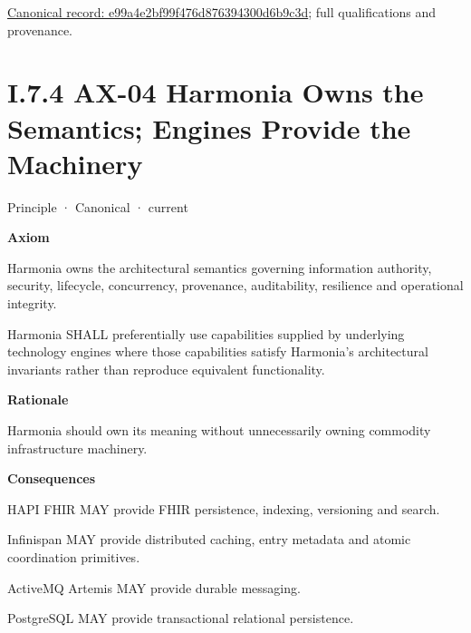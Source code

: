{\footnotesize \href{../../../../../../../../continuum/motivation/principle/e99a4e2bf99f476d876394300d6b9c3d.md}{Canonical record: e99a4e2bf99f476d876394300d6b9c3d}; full qualifications and provenance.}\par
\section*{I.7.4 AX-04 Harmonia Owns the Semantics; Engines Provide the Machinery}
\label{navigation:I.7.4}

\label{element:54508cda80484a6caf95b901780eaf7d}
{\small Principle · Canonical · current}\par

\par\medskip\textbf{Axiom}\par


Harmonia owns the architectural semantics governing information
authority, security, lifecycle, concurrency, provenance, auditability,
resilience and operational integrity.



Harmonia SHALL preferentially use capabilities supplied by underlying
technology engines where those capabilities satisfy Harmonia's
architectural invariants rather than reproduce equivalent functionality.



\par\medskip\textbf{Rationale}\par


Harmonia should own its meaning without unnecessarily owning commodity
infrastructure machinery.



\par\medskip\textbf{Consequences}\par


HAPI FHIR MAY provide FHIR persistence, indexing, versioning and search.



Infinispan MAY provide distributed caching, entry metadata and atomic
coordination primitives.



ActiveMQ Artemis MAY provide durable messaging.



PostgreSQL MAY provide transactional relational persistence.



